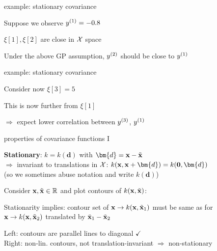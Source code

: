 \documentclass[11pt,compress,t,notes=noshow, xcolor=table]{beamer}
\begin{document}
\begin{framei}{example: stationary covariance} 
\item Suppose we observe $\yi[1] = -0.8$ 
\item $\xi[1], \xi[2]$ are close in $\Xspace$ space 
\item Under the above GP assumption, $\yi[2]$ should be close to $\yi[1]$ 
\vfill 
{} 
\end{framei} 

\begin{framei}{example: stationary covariance} 
\item Consider now $\xi[3] = 5$ 
\item This is now further from $\xi[1]$
\item $\Rightarrow$ expect lower correlation between $\yi[3]$, $\yi[1]$ 
\vfill 
{} 
\end{framei}


\begin{framei}[sep=M]{properties of covariance functions I}
\item \textbf{Stationary}: $k = k(\bm{d})$ with $\bm{d} = \xv - \xtil$ \\
$\Rightarrow$ invariant to translations in $\Xspace$: $k(\xv, \xv + \bm{d}) = k(\zero, \bm{d})$\\
(so we sometimes abuse notation and write $k(\bm{d})$)
\item Consider $\xv, \xtil \in \mathbb{R}$ and plot contours of $k(\xv,\xtil)$: 
\item Stationarity implies: contour set of $\xv \to k(\xv,\xtil_1)$ must be same as for $\xv \to k(\xv, \xtil_2)$ translated by $\xtil_1-\xtil_2$ 
\item Left: contours are parallel lines to diagonal $\checkmark$\\ 
Right: non-lin. contours, not translation-invariant $\Rightarrow$ non-stationary
\end{framei}
\end{document}
